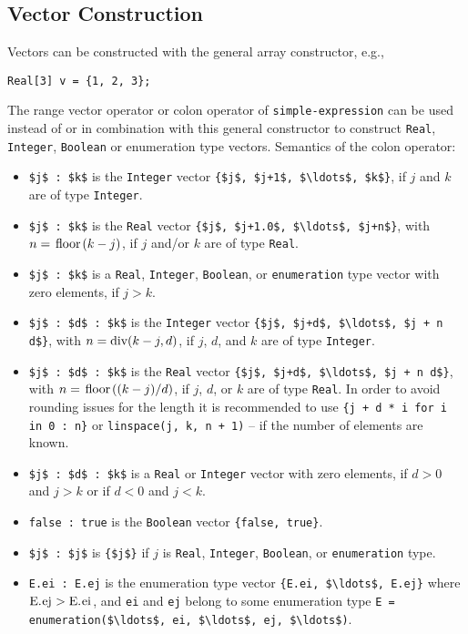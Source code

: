 \subsection{Vector Construction}\label{vector-construction}

Vectors can be constructed with the general array constructor, e.g.,
\begin{lstlisting}[language=modelica]
Real[3] v = {1, 2, 3};
\end{lstlisting}
The range vector operator or colon operator of \lstinline[language=grammar]!simple-expression! can be used instead of or in combination with this general constructor to construct \lstinline!Real!, \lstinline!Integer!, \lstinline!Boolean! or enumeration type vectors.
Semantics of the colon operator:
\begin{itemize}
\item
  \lstinline!$j$ : $k$! is the \lstinline!Integer! vector \lstinline!{$j$, $j+1$, $\ldots$, $k$}!, if $j$ and $k$ are of type
  \lstinline!Integer!.
\item
  \lstinline!$j$ : $k$! is the \lstinline!Real! vector \lstinline!{$j$, $j+1.0$, $\ldots$, $j+n$}!, with $n = \text{\lstinline!floor!}(k - j)$, if
  $j$ and/or $k$ are of type \lstinline!Real!.
\item
  \lstinline!$j$ : $k$! is a \lstinline!Real!, \lstinline!Integer!, \lstinline!Boolean!, or \lstinline!enumeration! type vector with zero elements, if $j > k$.
\item
  \lstinline!$j$ : $d$ : $k$! is the \lstinline!Integer! vector \lstinline!{$j$, $j+d$, $\ldots$, $j + n d$}!, with $n = \text{\lstinline!div!}(k - j, d)$, if $j$, $d$, and $k$ are of type \lstinline!Integer!.
\item
  \lstinline!$j$ : $d$ : $k$! is the \lstinline!Real! vector \lstinline!{$j$, $j+d$, $\ldots$, $j + n d$}!, with $n = \text{\lstinline!floor!}((k-j)/d)$,
  if $j$, $d$, or $k$ are of type \lstinline!Real!.  In order to avoid rounding issues for the length it is recommended to use \lstinline!{j + d * i for i in 0 : n}! or
  \lstinline!linspace(j, k, n + 1)! -- if the number of elements are known.
\item
  \lstinline!$j$ : $d$ : $k$! is a \lstinline!Real! or \lstinline!Integer! vector with zero elements, if $d > 0$ and $j > k$ or if $d < 0$ and $j < k$.
\item
  \lstinline!false : true! is the \lstinline!Boolean! vector \lstinline!{false, true}!.
\item
  \lstinline!$j$ : $j$! is \lstinline!{$j$}! if $j$ is \lstinline!Real!, \lstinline!Integer!, \lstinline!Boolean!, or \lstinline!enumeration! type.
\item
  \lstinline!E.ei : E.ej! is the enumeration type vector \lstinline!{E.ei, $\ldots$, E.ej}! where
  $\text{\lstinline!E.ej!} > \text{\lstinline!E.ei!}$, and \lstinline!ei! and \lstinline!ej! belong to some enumeration type
  \lstinline!E = enumeration($\ldots$, ei, $\ldots$, ej, $\ldots$)!.
\end{itemize}

